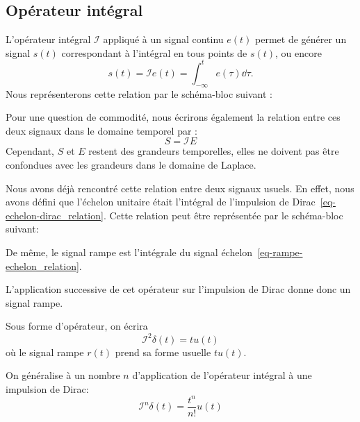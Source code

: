 \subsection{Opérateur intégral}
L'opérateur intégral $\mathcal{I}$ appliqué à un signal 
continu $e(t)$ permet de générer un signal $s(t)$ correspondant 
à l'intégral en tous points de $s(t)$, ou encore
\[
    s(t)=\mathcal{I} e(t)=\int_{-\infty}^t e(\tau)\dd{\tau}.
\]
Nous représenterons cette relation par le schéma-bloc suivant :
\begin{center}
    
\end{center}
Pour une question de commodité, nous écrirons également la relation entre ces 
deux signaux dans le domaine temporel par :
\[
    S=\mathcal{I} E
\]
Cependant, $S$ et $E$ restent des grandeurs temporelles, elles ne doivent pas
être confondues avec les grandeurs dans le domaine de Laplace.

Nous avons déjà rencontré cette relation entre deux signaux usuels. En effet, 
nous avons défini que l'échelon unitaire était l'intégral de l'impulsion de 
Dirac~\cref{eq-echelon-dirac_relation}. Cette relation peut être représentée
par le schéma-bloc suivant:
\begin{center}
    
\end{center}
De même, le signal rampe est l'intégrale du signal échelon~\cref{eq-rampe-echelon_relation}.
\begin{center}
    
\end{center}
L'application successive de cet opérateur sur l'impulsion de Dirac donne 
donc un signal rampe.
\begin{center}
    
\end{center}
Sous forme d'opérateur, on écrira 
\[
    \mathcal{I}^2\delta(t)=tu(t)
\]
où le signal rampe $r(t)$ prend sa forme usuelle $tu(t)$.

On généralise à un nombre $n$ d'application de l'opérateur intégral à une
impulsion de Dirac:
\[
    \mathcal{I}^n\delta(t)=\dfrac{t^n}{n!}u(t)
\]
